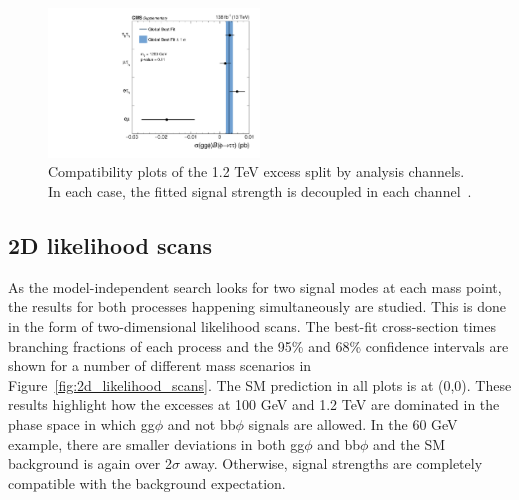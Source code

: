 \begin{figure}[!hbtp]
\centering
    \includegraphics[width=0.5\textwidth]{Figures/ccc_fit_result_mH1200_per-channel.pdf}
\caption[Plots of the compatibility of the 1.2 TeV excess across the di-$\tau$ decay channels.]{Compatibility plots of the 1.2 TeV excess split by analysis channels. In each case, the fitted signal strength is decoupled in each channel~\cite{CMS:2022rbd}.}
\label{fig:high_mass_compatibility}
\end{figure}

\subsection{2D likelihood scans}

As the model-independent search looks for two signal modes at each mass point, the results for both processes happening simultaneously are studied.
This is done in the form of two-dimensional likelihood scans.
The best-fit cross-section times branching fractions of each process and the 95\% and 68\% confidence intervals are shown for a number of different mass scenarios in Figure~\ref{fig:2d_likelihood_scans}.
The \ac{SM} prediction in all plots is at (0,0).
These results highlight how the excesses at 100 GeV and 1.2 TeV are dominated in the phase space in which gg$\phi$ and not bb$\phi$ signals are allowed.
In the 60 GeV example, there are smaller deviations in both gg$\phi$ and bb$\phi$ and the SM background is again over 2$\sigma$ away.
Otherwise, signal strengths are completely compatible with the background expectation.


